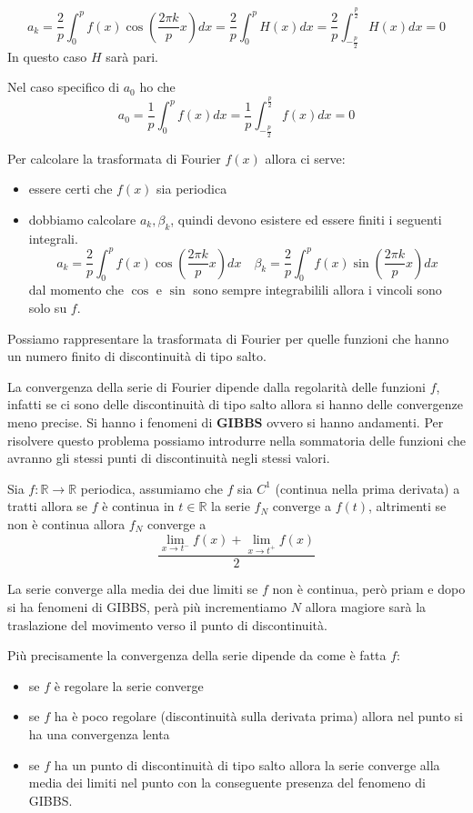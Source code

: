 $$a_k = \frac{2}{p} \int_{0}^{p}f(x) \cos (\frac{2\pi k}{p}x)dx =\frac{2}{p} \int_{0}^{p}H(x)dx =\frac{2}{p} \int_{-\frac{p}{2}}^{\frac{p}{2}}H(x)dx = 0$$ 
In questo caso $H$ sarà pari.

Nel caso specifico di $a_0$ ho che 
$$a_0 =\frac{1}{p} \int_{0}^{p}f(x)dx =   \frac{1}{p} \int_{-\frac{p}{2}}^{\frac{p}{2}}f(x)dx = 0$$

Per calcolare la trasformata di Fourier $f(x)$ allora ci serve:
\begin{itemize}
    \item essere certi che $f(x)$ sia periodica
    \item dobbiamo calcolare $a_k,\beta_k$, quindi devono esistere 
    ed essere finiti i seguenti integrali.
    $$a_k = \frac{2}{p}\int_{0}^{p}f(x)\cos(\frac{2\pi k}{p}x)dx \quad \beta_k=\frac{2}{p}\int_{0}^{p}f(x)\sin(\frac{2\pi k}{p}x)dx$$
    dal momento che $\cos$ e $\sin$ sono sempre integrabilili allora 
    i vincoli sono solo su $f$.
\end{itemize}

\begin{nota}
    Possiamo rappresentare la trasformata di Fourier per quelle funzioni che hanno 
    un numero finito di discontinuità di tipo salto.
\end{nota}

La convergenza della serie di Fourier dipende dalla regolarità delle funzioni $f$,
infatti se ci sono delle discontinuità di tipo salto allora si hanno delle 
convergenze meno precise. Si hanno i fenomeni di \textbf{GIBBS} ovvero si hanno andamenti.
Per risolvere questo problema possiamo introdurre nella sommatoria delle funzioni 
che avranno gli stessi punti di discontinuità negli stessi valori.

\begin{teorema}
    Sia $f:\mathbb{R}\to \mathbb{R}$ periodica, assumiamo che $f$ sia $C^1$ (continua 
    nella prima derivata) a tratti allora se $f$ è continua in $t\in \mathbb{R}$ la 
    serie $f_N$ converge a $f(t)$, altrimenti se non è continua allora $f_N$ converge a 
    $$\frac{\lim_{x\to t^-}f(x) +\lim_{x\to t^+}f(x)}{2} $$
    
\end{teorema}
La serie converge alla media dei due limiti se $f$ non è continua, però priam e dopo
si ha fenomeni di GIBBS, perà più incrementiamo $N$ allora magiore sarà la traslazione
del movimento verso il punto di discontinuità. 

Più precisamente la convergenza della serie dipende da come è fatta $f$:
\begin{itemize}
    \item se $f$ è regolare la serie converge
    \item se $f$ ha è poco regolare (discontinuità sulla derivata prima) allora nel 
    punto si ha una convergenza lenta
    \item se $f$ ha un punto di discontinuità di tipo salto allora la serie converge 
    alla media dei limiti nel punto con la conseguente presenza del fenomeno di GIBBS.
\end{itemize}

